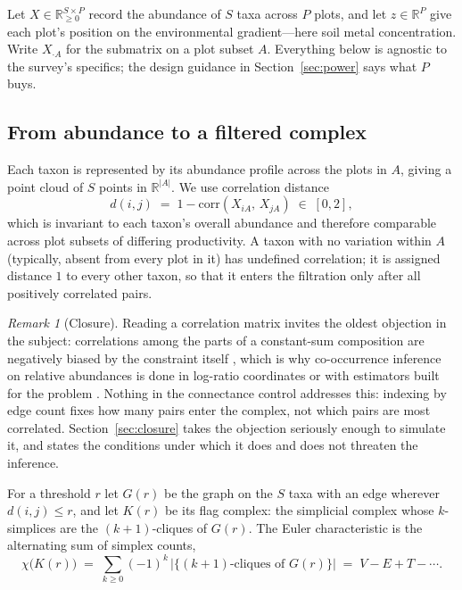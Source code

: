 \documentclass[review,12pt,authoryear]{elsarticle}
\theoremstyle{remark}
\newtheorem{remark}{Remark}
\begin{document}
Let $X \in \mathbb{R}_{\ge 0}^{S \times P}$ record the abundance of $S$ taxa
across $P$ plots, and let $z \in \mathbb{R}^{P}$ give each plot's position on the
environmental gradient---here soil metal concentration. Write $X_{\cdot A}$ for
the submatrix on a plot subset $A$. Everything below is agnostic to the survey's
specifics; the design guidance in Section~\ref{sec:power} says what $P$ buys.

\subsection{From abundance to a filtered complex}
\label{sec:complex}

Each taxon is represented by its abundance profile across the plots in $A$,
giving a point cloud of $S$ points in $\mathbb{R}^{|A|}$. We use correlation
distance
\[
  d(i,j) \;=\; 1 - \mathrm{corr}\!\left(X_{i A},\, X_{j A}\right)
  \;\in\; [0,2],
\]
which is invariant to each taxon's overall abundance and therefore comparable
across plot subsets of differing productivity. A taxon with no variation
within $A$ (typically, absent from every plot in it) has undefined
correlation; it is assigned distance $1$ to every other taxon, so that it
enters the filtration only after all positively correlated pairs.

\begin{remark}[Closure]
\label{rem:closure}
Reading a correlation matrix invites the oldest objection in the subject:
correlations among the parts of a constant-sum composition are negatively
biased by the constraint itself \citep{pearson1897spurious}, which is why
co-occurrence inference on relative abundances is done in log-ratio
coordinates \citep{aitchison1982, gloor2017microbiome} or with estimators
built for the problem \citep{friedman2012sparcc, kurtz2015spieceasi}.
Nothing in the connectance control addresses this: indexing by edge count
fixes how many pairs enter the complex, not which pairs are most
correlated. Section~\ref{sec:closure} takes the objection seriously enough
to simulate it, and states the conditions under which it does and does not
threaten the inference.
\end{remark}

For a threshold $r$ let $G(r)$ be the graph on the $S$ taxa with an edge wherever
$d(i,j) \le r$, and let $K(r)$ be its flag complex: the simplicial complex whose
$k$-simplices are the $(k+1)$-cliques of $G(r)$. The Euler characteristic is the
alternating sum of simplex counts,
\[
  \chi\bigl(K(r)\bigr) \;=\; \sum_{k \ge 0} (-1)^{k}\,
  \bigl|\{(k{+}1)\text{-cliques of } G(r)\}\bigr|
  \;=\; V - E + T - \cdots .
\]
\end{document}
